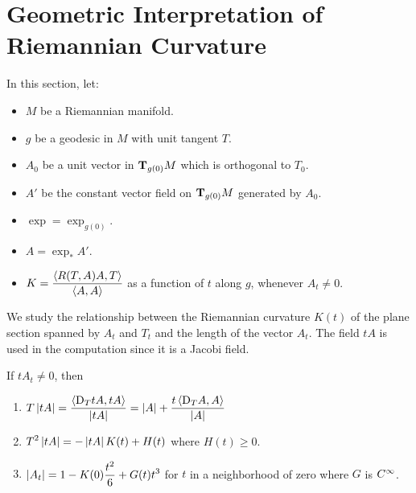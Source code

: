 \documentclass[../main]{subfiles}
\begin{document}
\section{Geometric Interpretation of Riemannian Curvature}\label{ch10:s3}

In this section, let:
\begin{itemize}
    \item $M$ be a Riemannian manifold.
    \item $g$ be a geodesic in $M$ with unit tangent $T$.
    \item $A_0$ be a unit vector in $\ts{M}{g(0)}$ which is orthogonal to $T_0$.
    \item $A'$ be the constant vector field on $\ts{M}{g(0)}$ generated by $A_0$.
    \item $\exp = \exp_{g(0)}$.
    \item $A = \exp_*A'$.
    \item $K = \dfrac{\ip{R(T,A)A}{T}}{\ip AA}$ as a function of $t$ along $g$, whenever $A_t\ne0$.
\end{itemize}
We study the relationship between the Riemannian curvature $K(t)$ of the plane section spanned by $A_t$ and $T_t$ and the length of the vector $A_t$. The field $tA$ is used in the computation since it is a Jacobi field.



\begin{lemma} \label{lem:ch10.3.1}
If $tA_t\ne0$, then
\begin{enumerate}[label=(\arabic*)]
    
    \item \label{enu:ch10s3.1}
    $\displaystyle T\norm{tA} = \frac{\ip{\D_TtA}{tA}}{\norm{tA}}
    = \norm A + \frac{t\ip{\D_TA}{A}}{\norm A}$
    
    \item \label{enu:ch10s3.2}
    $\displaystyle T^2\norm{tA} = -\norm{tA}K(t) + H(t)$ where $H(t)\ge0$.
    
    \item \label{enu:ch10s3.3}
    $\displaystyle \norm{A_t} = 1 - K(0)\frac{t^2}{6} + G(t)t^3$ for $t$ in a neighborhood of zero where $G$ is $\CInfty$.
    
\end{enumerate}
\end{lemma}
\end{document}
